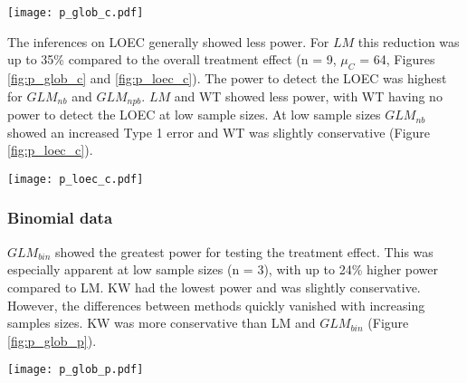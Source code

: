 \documentclass[twocolumn, natbib]{svjour3}
\begin{document}
\begin{figure*}
  \centering
  \texttt{[image: p\_glob\_c.pdf]}
  \caption{Count data simulations: Power (top) and Type 1 error (bottom) for the test of a treatment effect.
  For n = 3 and $\mu_C$ = \{2, 4\} less than 80\% of $GLM_{nb}$ and $GLM_{npb}$ models did converge.
  Dashed horizontal line denotes the nominal Type 1 error rate at $\alpha = 0.05$.
  }
  \label{fig:p_glob_c}
\end{figure*}

The inferences on LOEC generally showed less power.
For $LM$ this reduction was up to 35\% compared to the overall treatment effect (n = 9, $\mu_C$ = 64, Figures \ref{fig:p_glob_c} and \ref{fig:p_loec_c}).
The power to detect the LOEC was highest for $GLM_{nb}$ and $GLM_{npb}$. $LM$ and WT showed less power, with WT having no power to detect the LOEC at low sample sizes.
At low sample sizes $GLM_{nb}$ showed an increased Type 1 error and WT was slightly conservative (Figure \ref{fig:p_loec_c}).

\begin{figure*}
  \centering
  \texttt{[image: p\_loec\_c.pdf]}
  \caption{Count data simulations: Power (top) and Type 1 error (bottom) for determination of LOEC.
  For n = 3 and $\mu_C$ = \{2, 4\} less than 80\% of $GLM_{nb}$ and $GLM_{npb}$ models did converge.
  Dashed horizontal line denotes the nominal Type 1 error rate at $\alpha = 0.05$.
  }
  \label{fig:p_loec_c}
\end{figure*}


\subsubsection{Binomial data}
$GLM_{bin}$ showed the greatest power for testing the treatment effect. 
This was especially apparent at low sample sizes (n = 3), with up to 24\% higher power compared to LM.
KW had the lowest power and was slightly conservative.
However, the differences between methods quickly vanished with increasing samples sizes. 
KW was more conservative than LM and $GLM_{bin}$ (Figure \ref{fig:p_glob_p}).

\begin{figure*}
  \centering
  \texttt{[image: p\_glob\_p.pdf]}
  \caption{
  Binomial data simulations: 
  Power (top) and Type 1 error (bottom) for the test of a treatment effect. 
  Dashed horizontal line denotes the nominal Type 1 error rate at $\alpha = 0.05$.
  }
  \label{fig:p_glob_p}
\end{figure*}
\end{document}
